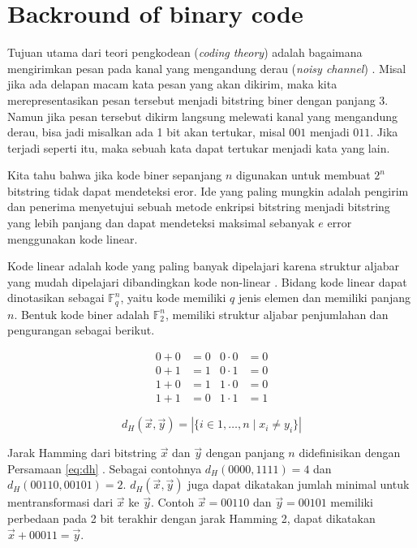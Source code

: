 \documentclass[conference,compsoc]{IEEEtran}
\newcommand{\refeq}[1]{Persamaan \ref{#1}}
\begin{document}
\section{Backround of binary code}

Tujuan utama dari teori pengkodean (\textit{coding theory}) adalah bagaimana mengirimkan pesan pada kanal yang mengandung derau (\textit{noisy channel}) \cite{VanLint2016}. Misal jika ada delapan macam kata pesan yang akan dikirim, maka kita merepresentasikan pesan tersebut menjadi bitstring biner dengan panjang 3. Namun jika pesan tersebut dikirm langsung melewati kanal yang mengandung derau, bisa jadi misalkan ada 1 bit akan tertukar, misal $001$ menjadi $011$. Jika terjadi seperti itu, maka sebuah kata dapat tertukar menjadi kata yang lain.

Kita tahu bahwa jika kode biner sepanjang $n$ digunakan untuk membuat $2^n$ bitstring tidak dapat mendeteksi eror. Ide yang paling mungkin adalah pengirim dan penerima menyetujui sebuah metode enkripsi bitstring menjadi bitstring yang lebih panjang dan dapat mendeteksi maksimal sebanyak $e$ error menggunakan kode linear.

Kode linear adalah kode yang paling banyak dipelajari karena struktur aljabar yang mudah dipelajari dibandingkan kode non-linear \cite{Huffman}. Bidang kode linear dapat dinotasikan sebagai $\mathbb{F}_q^n$, yaitu kode memiliki $q$ jenis elemen dan memiliki panjang $n$. Bentuk kode biner adalah $\mathbb{F}_2^n$, memiliki struktur aljabar penjumlahan dan pengurangan sebagai berikut.

\begin{align*}
0 + 0 &= 0 & 0 \cdot 0 &= 0 \\
0 + 1 &= 1 & 0 \cdot 1 &= 0 \\
1 + 0 &= 1 & 1 \cdot 0 &= 0 \\
1 + 1 &= 0 & 1 \cdot 1 &= 1
\end{align*}

\begin{equation} \label{eq:dh}
d_H(\vec{x},\vec{y}) = |\{i \in {1,\ldots,n} \mid x_i \neq y_i\}|
\end{equation}

Jarak Hamming dari bitstring $\vec{x}$ dan $\vec{y}$ dengan panjang $n$ didefinisikan dengan \refeq{eq:dh} \cite{Cicalese2000}. Sebagai contohnya $d_H(0000,1111)= 4$ dan $d_H(00110,00101)= 2$. $d_H(\vec{x},\vec{y})$ juga dapat dikatakan jumlah minimal untuk mentransformasi dari $\vec{x}$ ke $\vec{y}$. Contoh $\vec{x}=00110$ dan $\vec{y}=00101$ memiliki perbedaan pada 2 bit terakhir dengan jarak Hamming 2, dapat dikatakan $\vec{x}+00011 = \vec{y}$.
\end{document}
